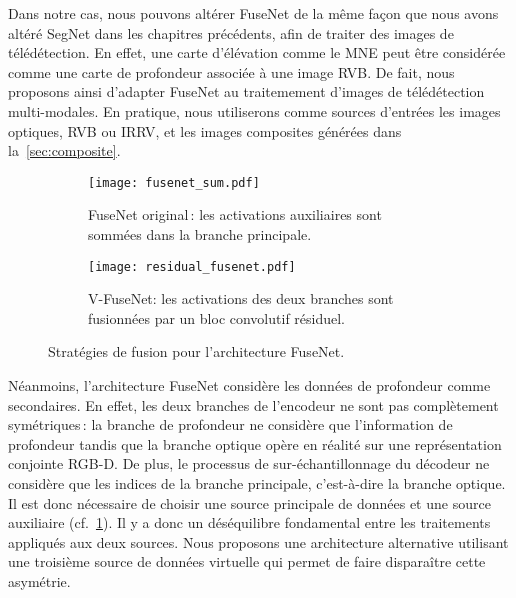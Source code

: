 Dans notre cas, nous pouvons altérer FuseNet de la même façon que nous avons altéré SegNet dans les chapitres précédents, afin de traiter des images de télédétection. En effet, une carte d'élévation comme le \gls{MNE} peut être considérée comme une carte de profondeur associée à une image \gls{RVB}. De fait, nous proposons ainsi d'adapter FuseNet au traitemement d'images de télédétection multi-modales. En pratique, nous utiliserons comme sources d'entrées les images optiques, \gls{RVB} ou \gls{IRRV}, et les images composites générées dans la~\cref{sec:composite}.

\begin{figure}[h]
	\begin{subfigure}{0.48\textwidth}
    	\texttt{[image: fusenet\_sum.pdf]}
        \caption{FuseNet original\,: les activations auxiliaires sont sommées dans la branche principale.}
        \label{fig:fusenet_sum}
    \end{subfigure}
    \hfill
    \begin{subfigure}{0.48\textwidth}
    	\texttt{[image: residual\_fusenet.pdf]}
        \caption{V-FuseNet: les activations des deux branches sont fusionnées par un bloc convolutif résiduel.}
        \label{fig:fusenet_mix}
    \end{subfigure}
    \caption{Stratégies de fusion pour l'architecture FuseNet.}
\end{figure}

Néanmoins, l'architecture FuseNet considère les données de profondeur comme secondaires. En effet, les deux branches de l'encodeur ne sont pas complètement symétriques\,: la branche de profondeur ne considère que l'information de profondeur tandis que la branche optique opère en réalité sur une représentation conjointe \gls{RGB-D}. De plus, le processus de sur-échantillonnage du décodeur ne considère que les indices de la branche principale, c'est-à-dire la branche optique. Il est donc nécessaire de choisir une source principale de données et une source auxiliaire (cf.~\cref{fig:fusenet_sum}). Il y a donc un déséquilibre fondamental entre les traitements appliqués aux deux sources. Nous proposons une architecture alternative utilisant une troisième source de données virtuelle qui permet de faire disparaître cette asymétrie.

